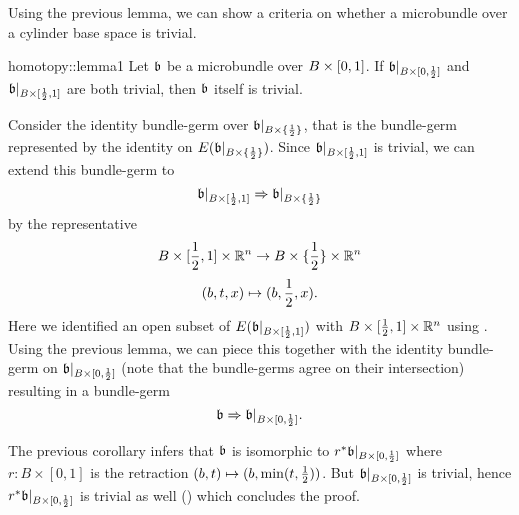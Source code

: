 \begin{scope}
    \newcommand{\bbleft} {
        \bb\restr{B \times{} [0, \half]}
    }
    \newcommand{\bbright} {
        \bb\restr{B \times{} [\half, 1]}
    }
    \newcommand{\bbhalf} {
        \bb\restr{B \times{} \coll{\half{}}}
    }

    \begin{myparagraph}
        Using the previous lemma,
        we can show a criteria on whether a microbundle
        over a cylinder base space is trivial.        
    \end{myparagraph}

    \begin{mylemma}{homotopy::lemma1}{}
        Let $\mathfrak{b}$ be a microbundle over $B \times{} [0, 1]$. If $\bbleft$ and $\bbright$ are both trivial,
        then $\mathfrak{b}$ itself is trivial.
    \end{mylemma}

    \begin{myproof}
        Consider the identity bundle-germ over $\bbhalf$, that is the bundle-germ represented by the identity on $E(\bbhalf)$.
        Since $\bbright$ is trivial, we can extend this bundle-germ to 
        \[ \germ{\bbright}{\bbhalf} \]
        by the representative
        \[ B \times [\frac{1}{2}, 1] \times \mathbb{R}^n \to B \times \{\frac{1}{2}\} \times \mathbb{R}^n \]
        \[ (b, t, x) \mapsto (b, \frac{1}{2}, x). \]
        Here we identified an open subset of $E(\mathfrak{b}\vert_{B \times [\frac{1}{2}, 1]})$ with $B \times [\frac{1}{2}, 1] \times \mathbb{R}^n$ using .
        Using the previous lemma, we can piece this together with the identity bundle-germ on $\bbleft$ (note that the bundle-germs agree on their intersection) resulting in a bundle-germ
        \[ \germ{\bb}{\bbleft}. \]

        The previous corollary infers that $\mathfrak{b}$ is isomorphic to $\ind{r}\bbleft$ where $r: B \times [0, 1]$ is the retraction $(b, t) \mapsto (b, \min(t, \frac{1}{2}))$.
        But $\bbleft$ is trivial, hence $\ind{r}\bbleft$ is trivial as well () which concludes the proof.
    \end{myproof}
\end{scope}
